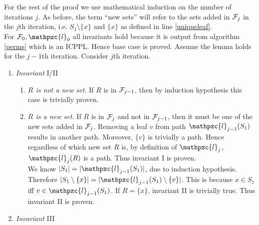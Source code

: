 \documentclass{CRPITStyle} %
\def\cF{{\cal F}}
\def\cl{\mathpzc{l}}
\def\xnoindent{} %
\newenvironment{proof}[1][Proof]{\begin{trivlist} %
\item[\hskip \labelsep {\bfseries #1}]}{\end{trivlist}} %
\begin{document}
\noindent
\begin{proof}[Proof of lemma \ref{lem:invar3} (alternate)]
  \xnoindent For the rest of the proof we use mathematical induction
  on the number of iterations $j$. As before, the term ``new sets''
  will refer to the sets added in $\cF_j$ in the $j$th iteration,
  i.e. $S_1  \setminus \{x\}$ and $\{x\}$ as defined in line
  \ref{uniqueleaf}.\\ 
  For $\cF_0, \cl_0$ all invariants hold because it is output from
  algorithm \ref{perms} which is an ICPPL. Hence base case is proved.
  Assume the lemma holds for the $j-1$th iteration. Consider $j$th
  iteration.  \xnoindent
  \begin{enumerate}[\textreferencemark]
  \item {\em Invariant} I/II
    \begin{enumerate}[{I/II}a $|$]
    \item {\em $R$ is not a new set.} If $R$ is in $\cF_{j-1}$, then
      by induction hypothesis this case is trivially proven.
    \item {\em $R$ is a new set.} If $R$ is in $\cF_{j}$ and not in
      $\cF_{j-1}$, then it must be one of the new sets added in
      $\cF_j$. Removing a leaf $v$ from path $\cl_{j-1}(S_1)$ results
      in another path. Moreover, $\{v\}$ is trivially a path. Hence
      regardless of which new set $R$ is, by definition of
      $\cl_j$, $\cl_{j}(R)$ is a path. Thus invariant I is proven.\\
      We know $|S_1| = |\cl_{j-1}(S_1)|$, due to induction
      hypothesis. Therefore $|S_1 \setminus \{x\}| = |\cl_{j-1}(S_1)
      \setminus \{v\}|$. This is because $x \in S_1$ iff $v \in
      \cl_{j-1}(S_1)$. If $R = \{x\}$, invariant II is trivially
      true. Thus invariant II is proven.
    \end{enumerate}
  \item {\em Invariant} III
\end{enumerate}
\end{proof}
\end{document}

